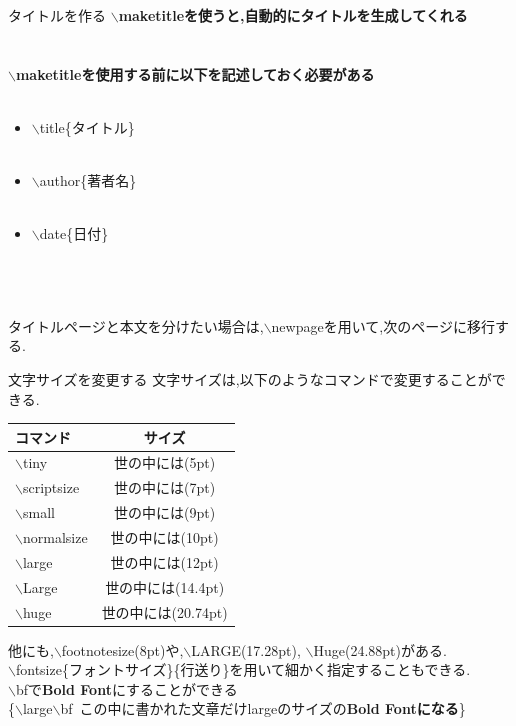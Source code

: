 \documentclass[dvipdfmx]{beamer}
\newcommand{\tbs}{$\backslash$}
\begin{document}
  \begin{frame}{タイトルを作る}
    \bf
    \tbs maketitleを使うと,自動的にタイトルを生成してくれる\\~\\~\\
    \scriptsize
    \tbs maketitleを使用する前に以下を記述しておく必要がある\\~\\
    \begin{itemize}
      \item \tbs title\{タイトル\}\\~\\
      \item \tbs author\{著者名\}\\~\\
      \item \tbs date\{日付\}
    \end{itemize}
    ~\\~\\~\\
    タイトルページと本文を分けたい場合は,\tbs newpageを用いて,次のページに移行する.
  \end{frame}
  \begin{frame}{文字サイズを変更する}
    文字サイズは,以下のようなコマンドで変更することができる.
    \begin{table}[h]
      \scriptsize
      \begin{tabular}{|l|c|}\hline
        コマンド&サイズ \\ \hline
        \tbs tiny&{\tiny 世の中には(5pt)} \\ \hline
        \tbs scriptsize&世の中には(7pt) \\ \hline
        \tbs small&{\small 世の中には(9pt)} \\ \hline
        \tbs normalsize & {\normalsize 世の中には(10pt)}\\ \hline
        \tbs large&{\large 世の中には(12pt)} \\ \hline
        \tbs Large&{\Large 世の中には(14.4pt)} \\ \hline
        \tbs huge&{\huge 世の中には(20.74pt)} \\ \hline
      \end{tabular}
    \end{table}
    {\scriptsize *他にも,\tbs footnotesize(8pt)や,\tbs LARGE(17.28pt), \tbs Huge(24.88pt)がある.}\\
    {\scriptsize *\tbs fontsize\{フォントサイズ\}\{行送り\}を用いて細かく指定することもできる.}\\
    {\scriptsize *\tbs bfで{\bf Bold Font}にすることができる}\\
    {\scriptsize *\{\tbs large\tbs bf~この中に書かれた文章だけlargeのサイズの{\bf Bold Fontになる}\}}
  \end{frame}
\end{document}
